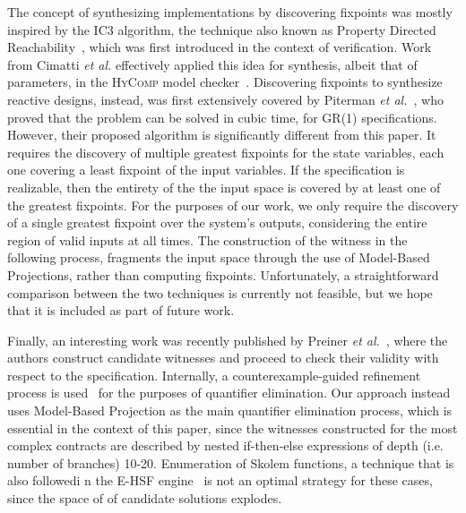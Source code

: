 The concept of synthesizing implementations by discovering fixpoints was mostly
inspired by the IC3 algorithm, the technique also known as Property Directed
Reachability~\cite{bradley2011sat,een2011efficient}, which was first introduced
in the context of verification. Work from Cimatti \textit{et al.} effectively
applied this idea for synthesis, albeit that of parameters, in the
\textsc{HyComp} model checker~\cite{DBLP:conf/fmcad/CimattiGMT13, cimatti2015hycomp}.
Discovering fixpoints to synthesize reactive designs, instead, was first
extensively covered by Piterman \textit{et al.}~\cite{piterman2006synthesis},
who proved that the problem can be solved in cubic time, for GR(1) specifications.
However, their proposed algorithm is significantly different from this paper. It
requires the discovery of multiple greatest fixpoints for the state variables,
each one covering a least fixpoint of the input variables. If the specification
is realizable, then the entirety of the the input space is covered by at least
one of the greatest fixpoints. For the purposes of our work, we only require the
discovery of a single greatest fixpoint over the system's outputs, considering
the entire region of valid inputs at all times. The construction of the witness
in the following process, fragments the input space through the use of Model-Based Projections, rather than computing fixpoints.
Unfortunately, a straightforward comparison between the two techniques is
currently not feasible, but we hope that it is included as part of future work.

Finally, an interesting work was recently published by Preiner \textit{et
al.}~\cite{preiner2017counterexample}, where the authors construct candidate
witnesses and proceed to check their validity with respect to the specification.
Internally, a counterexample-guided refinement process is
used~\cite{reynolds2015counterexample} for the purposes of quantifier
elimination. Our approach instead uses Model-Based Projection as the main
quantifier elimination process, which is essential in the context of this paper,
since the witnesses constructed for the most complex contracts are described by
nested if-then-else expressions of depth (i.e. number of branches) 10-20.
Enumeration of Skolem functions, a technique that is also followedi n the E-HSF
engine~\cite{beyene2014constraint} is not an optimal strategy for these cases,
since the space of of candidate solutions explodes.


